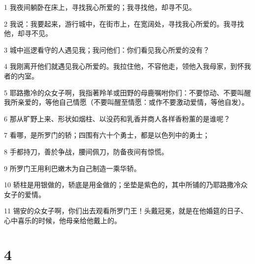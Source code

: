 \par 1 我夜间躺卧在床上，寻找我心所爱的；我寻找他，却寻不见。
\par 2 我说：我要起来，游行城中，在街市上，在宽阔处，寻找我心所爱的。我寻找他，却寻不见。
\par 3 城中巡逻看守的人遇见我；我问他们：你们看见我心所爱的没有？
\par 4 我刚离开他们就遇见我心所爱的。我拉住他，不容他走，领他入我母家，到怀我者的内室。
\par 5 耶路撒冷的众女子啊，我指著羚羊或田野的母鹿嘱咐你们：不要惊动、不要叫醒我所亲爱的，等他自己情愿（不要叫醒至情愿：或作不要激动爱情，等他自发）。
\par 6 那从旷野上来、形状如烟柱、以没药和乳香并商人各样香粉薰的是谁呢？
\par 7 看哪，是所罗门的轿；四围有六十个勇士，都是以色列中的勇士；
\par 8 手都持刀，善於争战，腰间佩刀，防备夜间有惊慌。
\par 9 所罗门王用利巴嫩木为自己制造一乘华轿。
\par 10 轿柱是用银做的，轿底是用金做的；坐垫是紫色的，其中所铺的乃耶路撒冷众女子的爱情。
\par 11 锡安的众女子啊，你们出去观看所罗门王！头戴冠冕，就是在他婚筵的日子、心中喜乐的时候，他母亲给他戴上的。

\chapter{4}

